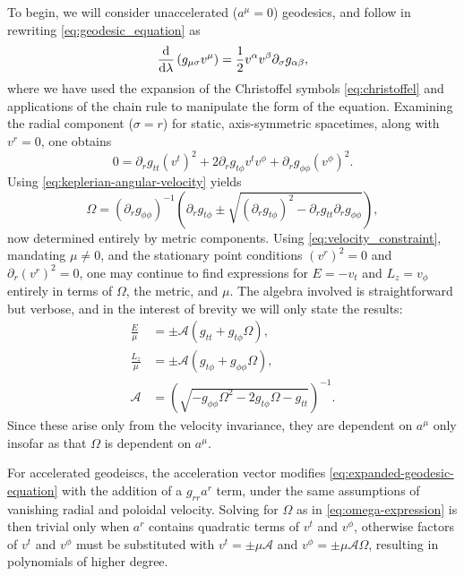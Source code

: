 To begin, we will consider unaccelerated ($a^\mu = 0$) geodesics, and follow \cite{johannsen_regular_2013} in rewriting \eqref{eq:geodesic_equation} as
\begin{equation}
    \frac{\text{d}}{\text{d} \lambda}\left( g_{\mu\sigma}v^\mu \right) = \frac{1}{2} v^\alpha v^\beta \partial_\sigma g_{\alpha \beta},
\end{equation}
where we have used the expansion of the Christoffel symbols \eqref{eq:christoffel} and applications of the chain rule to manipulate the form of the equation. Examining the radial component ($\sigma = r$) for static, axis-symmetric spacetimes, along with $v^r = 0$, one obtains
\begin{equation}
    \label{eq:expanded-geodesic-equation}
    0 =
    \partial_r g_{tt} (v^t)^2
    + 2\partial_r g_{t\phi} v^t v^\phi
    + \partial_r g_{\phi\phi} (v^\phi)^2.
\end{equation}
Using \eqref{eq:keplerian-angular-velocity} yields
\begin{equation}
    \label{eq:omega-expression}
    \Omega =
    \left( \partial_r g_{\phi\phi} \right)^{-1}\left( \partial_r g_{t\phi} \pm \sqrt{\left( \partial_r g_{t\phi} \right)^2 - \partial_r g_{tt} \partial_r g_{\phi\phi}} \right),
\end{equation}
now determined entirely by metric components. Using \eqref{eq:velocity_constraint}, mandating $\mu \neq 0$, and the stationary point conditions $(v^r)^2 = 0$ and $\partial_r (v^r)^2 = 0$, one may continue to find expressions for $E = -v_t$ and $L_z = v_\phi$ entirely in terms of $\Omega$, the metric, and $\mu$. The algebra involved is straightforward but verbose, and in the interest of brevity we will only state the results:
\begin{align}
    \frac{E}{\mu} &= \pm \mathcal{A} \left(g_{tt} + g_{t\phi}\Omega\right) , \label{eq:energy-of-orbit} \\
    \frac{L_z}{\mu} &= \pm \mathcal{A} \left(g_{t\phi} + g_{\phi\phi}\Omega\right), \\
    \mathcal{A} &= \left(\sqrt{-g_{\phi\phi} \Omega^2 - 2g_{t\phi} \Omega - g_{tt}}\right)^{-1}.
\end{align}
Since these arise only from the velocity invariance, they are dependent on $a^\mu$ only insofar as that $\Omega$ is dependent on $a^\mu$.

For accelerated geodeiscs, the acceleration vector modifies \eqref{eq:expanded-geodesic-equation} with the addition of a $g_{rr} a^r$ term, under the same assumptions of vanishing radial and poloidal velocity. Solving for $\Omega$ as in \eqref{eq:omega-expression} is then trivial only when $a^r$ contains quadratic terms of $v^t$ and $v^\phi$, otherwise factors of $v^t$ and $v^\phi$ must be substituted with $v^t = \pm \mu \mathcal{A}$ and $v^\phi = \pm \mu \mathcal{A} \Omega$, resulting in polynomials of higher degree.

